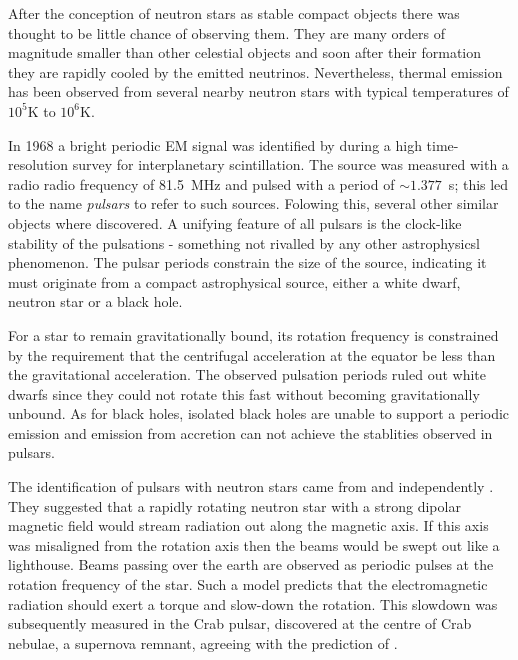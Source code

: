 After the conception of neutron stars as stable compact objects there was
thought to be little chance of observing them. They are many orders of magnitude
smaller than other celestial objects and soon after their formation they are
rapidly cooled by the emitted neutrinos. Nevertheless, thermal emission has
been observed from several nearby neutron stars with typical temperatures
of $10^{5}$K to $10^{6}$K.

In 1968 a bright periodic EM signal was identified by \citet{Hewish1968} during
a high time-resolution survey for interplanetary scintillation. The source was
measured with a radio radio frequency of 81.5~MHz and pulsed with a period of
$\sim 1.377$~s; this led to the name \emph{pulsars} to refer to such sources.
Folowing this, several other similar objects where discovered. A unifying
feature of all pulsars is the clock-like stability of the pulsations - something
not rivalled by any other astrophysicsl phenomenon.
The pulsar periods constrain the size of the source, indicating it must originate
from a compact astrophysical source, either a white dwarf, neutron star or
a black hole.

For a star to remain gravitationally bound, its rotation frequency is
constrained by the requirement that the centrifugal acceleration at the equator
be less than the gravitational acceleration. The observed pulsation periods
ruled out white dwarfs since they could not rotate this fast without becoming
gravitationally unbound. As for black holes, isolated black holes are unable to
support a periodic emission and emission from accretion can not achieve the
stablities observed in pulsars.

The identification of pulsars with neutron stars came from \citet{Pacini1967}
and independently \citet{Gold1968}. They suggested that a rapidly rotating
neutron star with a strong dipolar magnetic field would stream radiation out
along the magnetic axis. If this axis was misaligned from the rotation axis
then the beams would be swept out like a lighthouse. Beams passing over the
earth are observed as periodic pulses at the rotation frequency of the star.
Such a model predicts that the electromagnetic radiation should exert a torque
and slow-down the rotation.  This slowdown was subsequently measured in the
Crab pulsar, discovered at the centre of Crab nebulae, a supernova remnant,
agreeing with the prediction of \citet{Baade1934}.


